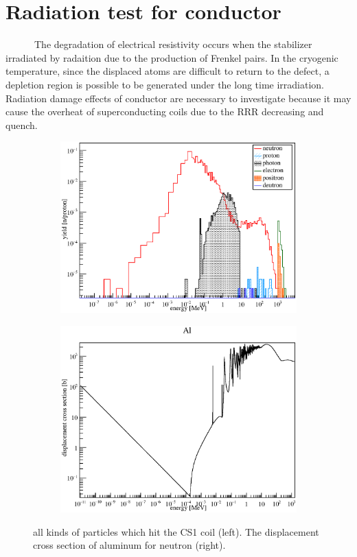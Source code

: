  \section{Radiation test for conductor}
~~~~~~The degradation of electrical resistivity occurs when the stabilizer irradiated by radaition due to the production of Frenkel pairs.
In the cryogenic temperature, since the displaced atoms are difficult to return to the defect, a depletion region is possible to be generated under the long time irradiation.
Radiation damage effects of conductor are necessary to investigate because it may cause the overheat of superconducting coils due to the RRR decreasing and quench.
\begin{figure}[H]
 \begin{subfigure}{0.3\textwidth}
  \centering
  \includegraphics[scale=0.43]{chapter4/fig/yield.eps}
 \end{subfigure}
 \hspace{0.2\textwidth}
 \begin{subfigure}{0.3\textwidth}
  \centering
  \includegraphics[scale=0.43]{chapter5/fig/AlDPA.eps}
 \end{subfigure}
 \caption{all kinds of particles which hit the CS1 coil (left). The displacement cross section of aluminum for neutron (right).}
 \label{3yield}
\end{figure}
